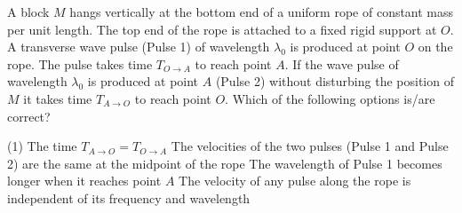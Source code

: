 \item A block \(M\) hangs vertically at the bottom end of a uniform rope of constant mass per
unit length. The top end of the rope is attached to a fixed rigid support at \(O\). A transverse wave
pulse (Pulse 1) of wavelength \(\lambda_0\) is produced at point \(O\) on the rope. The pulse takes time
\(T_{O \to A}\) to reach point \(A\). If the wave pulse of wavelength \(\lambda_0\) is produced at point
\(A\) (Pulse 2) without disturbing the position of \(M\) it takes time \(T_{A \to O}\) to reach point
\(O\). Which of the following options is/are correct?

\begin{center}
\end{center}

\begin{tasks}(1)
\task The time \(T_{A \to O} = T_{O \to A}\)
\task The velocities of the two pulses (Pulse 1 and Pulse 2) are the same at the midpoint of the rope
\task The wavelength of Pulse 1 becomes longer when it reaches point \(A\)
\task The velocity of any pulse along the rope is independent of its frequency and wavelength
\end{tasks}